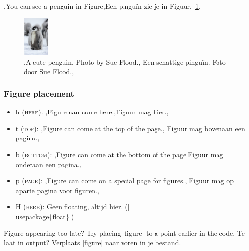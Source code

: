 \documentclass[presentatie.tex]{subfiles}
\begin{document}
\begin{frame}{}
	\vspace{-28px}
	
	\begin{penExResult}[3cm]
		\lang,You can see a penguin in Figure,Een pinguïn zie je in Figuur,~\ref{fig:pinguin}.
		\begin{figure}[h]
			\centering
			\includegraphics[height=2cm]{assets/pinguin.jpg}
			\caption{\lang,A cute penguin. Photo by Sue Flood.,%
			Een schattige pinguïn. Foto door Sue Flood.,}\label{fig:pinguin}
		\end{figure}
	\end{penExResult}
\end{frame}


\begin{frame}
	\frametitle{Figure placement}

	
	\begin{itemize}
		\item h \textsc{(here)}: \lang,Figure can come here.,Figuur mag hier.,
		\item t \textsc{(top)}: \lang,Figure can come at the top of the page.,%
			Figuur mag bovenaan een pagina.,
		\item b \textsc{(bottom)}: \lang,Figure can come at the bottom of the
			page,Figuur mag onderaan een pagina.,
		\item p \textsc{(page)}: \lang,Figure can come on a special page for figures.,%
			Figuur mag op aparte pagina voor figuren.,
		\item H \textsc{(here)}: 
		{Geen floating, altijd hier.} (\hll|\\usepackage\{float\}|)
	\end{itemize}

	\medskip
	\lang
	{Figure appearing too late? Try placing \hll|figure| to a point earlier in the code.}
	{Te laat in output? Verplaats \hll|figure| naar voren in je bestand.}
\end{frame}
\end{document}
